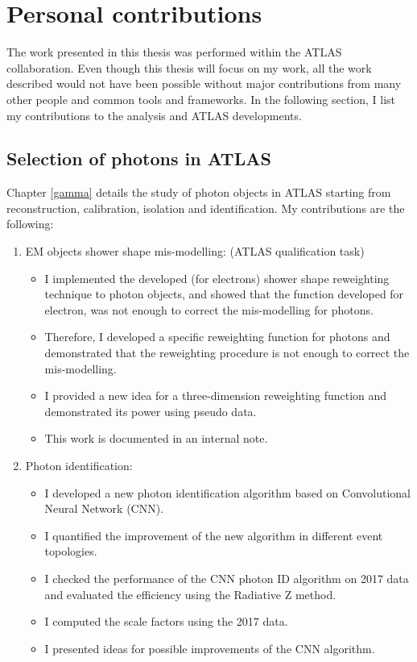 \newpage
\chapter*{Personal contributions}

The work presented in this thesis was performed within the ATLAS collaboration. Even though this thesis will focus on my work, all the work described would not have been possible without major contributions from many other people and common tools and frameworks. In the following section, I list my contributions to the analysis and ATLAS  developments.

\section*{Selection of photons in ATLAS}

Chapter \ref{gamma} details the study of photon objects in ATLAS starting from reconstruction, calibration, isolation and identification. My contributions are the following:

\begin{enumerate}
    \item EM objects shower shape mis-modelling: (ATLAS qualification task) 
\begin{itemize}
    \item I implemented the developed (for electrons) shower shape reweighting technique to photon objects, and showed that the function developed for electron, was not enough to correct the mis-modelling for photons. 
    \item Therefore, I developed a specific reweighting function for photons and demonstrated that the reweighting procedure is not enough to correct the mis-modelling. 
    \item I provided a new idea for a three-dimension reweighting function and demonstrated its power using pseudo data.
    \item This work is documented in an internal note.
 
\end{itemize}

\item Photon identification: 
\begin{itemize}
    \item I developed a new photon identification algorithm based on Convolutional Neural Network (CNN).
    \item I quantified the improvement of the new algorithm in different event topologies. 
    \item I checked the performance of the CNN photon ID algorithm on 2017 data and evaluated the efficiency using the Radiative Z method. 
    \item I computed the scale factors using the 2017 data. 
    \item I presented ideas for possible improvements of the CNN algorithm.
\end{itemize}
\end{enumerate}

